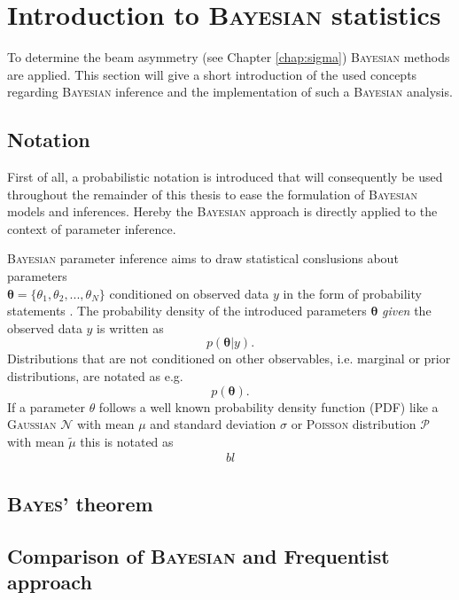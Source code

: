 \section{Introduction to \textsc{Bayesian} statistics}
\label{sec:bayes}
To determine the beam asymmetry (see Chapter \ref{chap:sigma}) \textsc{Bayesian} methods are applied. This section will give a short introduction of the used concepts regarding \textsc{Bayesian} inference and the implementation of such a \textsc{Bayesian} analysis.
\subsection{Notation}
 First of all, a probabilistic notation is introduced that will consequently be used throughout the remainder of this thesis to ease the formulation of \textsc{Bayesian} models and inferences. Hereby the \textsc{Bayesian} approach is directly applied to the context of parameter inference. 
 
 \noindent\textsc{Bayesian} parameter inference aims to draw statistical conslusions about parameters\\ $\boldsymbol{\theta}=\{\theta_1,\theta_2,...,\theta_N\}$ conditioned on observed data $y$ in the form of probability statements \cite{bayes}. The probability density of the introduced parameters $\boldsymbol{\theta}$ \emph{given} the observed data $y$ is written as 
 \begin{equation}
 	 p(\boldsymbol{\theta}|y).
 \end{equation}
Distributions that are not conditioned on other observables, i.e. marginal or prior distributions, are notated as e.g.
\begin{equation}
	p(\boldsymbol{\theta}).
\end{equation}
If a parameter $\theta$ follows a well known probability density function (PDF) like a \textsc{Gaussian} $\mathcal{N}$ with mean $\mu$ and standard deviation $\sigma$ or \textsc{Poisson} distribution $\mathcal{P}$ with mean $\tilde{\mu}$ this is notated as
\begin{align}
	bl
\end{align}
\subsection{\textsc{Bayes}' theorem}
\subsection{Comparison of \textsc{Bayesian} and Frequentist approach}
